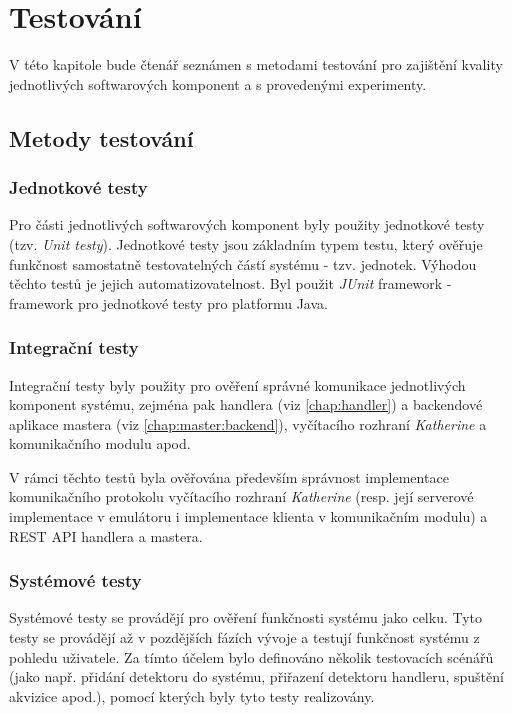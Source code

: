 

\chapter{Testování}\label{chap:test}
V této kapitole bude čtenář seznámen s metodami testování pro zajištění kvality jednotlivých softwarových komponent a s provedenými experimenty.

\section{Metody testování}
\subsection{Jednotkové testy}
Pro části jednotlivých softwarových komponent byly použity jednotkové testy \cite{testing_evans} (tzv. \textit{Unit testy}). Jednotkové testy jsou základním typem testu, který ověřuje funkčnost samostatně testovatelných částí systému - tzv. jednotek. Výhodou těchto testů je jejich automatizovatelnost. Byl použit \textit{JUnit} framework - framework pro jednotkové testy pro platformu Java. 

\subsection{Integrační testy}
Integrační testy byly použity pro ověření správné komunikace jednotlivých komponent systému, zejména pak handlera (viz \ref{chap:handler}) a backendové aplikace mastera (viz \ref{chap:master:backend}), vyčítacího rozhraní \textit{Katherine} a komunikačního modulu apod.

V rámci těchto testů byla ověřována především správnost implementace komunikačního protokolu vyčítacího rozhraní \textit{Katherine} (resp. její serverové implementace v emulátoru i implementace klienta v komunikačním modulu) a REST API handlera a mastera.

\subsection{Systémové testy}
Systémové testy se provádějí pro ověření funkčnosti systému jako celku. Tyto testy se provádějí až v pozdějších fázích vývoje a testují funkčnost systému z pohledu uživatele. Za tímto účelem bylo definováno několik testovacích scénářů (jako např. přidání detektoru do systému, přiřazení detektoru handleru, spuštění akvizice apod.), pomocí kterých byly tyto testy realizovány.

